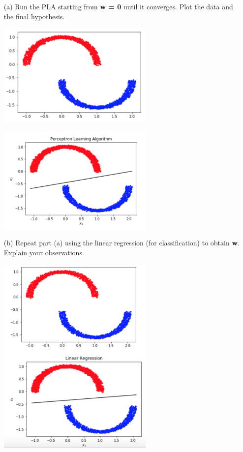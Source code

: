 \documentclass[a4paper]{article}
\begin{document}
\begin{itemize}
    \item[(a)] Run the PLA starting from \textbf{w = 0} until it converges.  Plot the data 
    and the final hypothesis.
    \begin{center}
        \includegraphics[width=0.6\textwidth]{3-1-a1.jpg}
    \end{center}
    \begin{center}
        \includegraphics[width=0.6\textwidth]{3-1-a2.jpg}
    \end{center}
    \item[(b)] Repeat part (a) using the linear regression (for classification) to obtain 
    \textbf{w}.  Explain your observations.
    \begin{center}
        \includegraphics[width=0.6\textwidth]{3-1-b.jpg}

\end{center}
\end{itemize}
\end{document}

